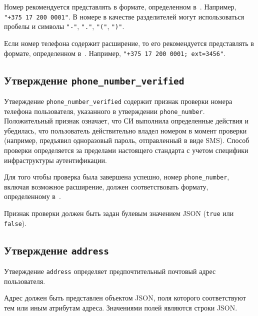 Номер рекомендуется представлять в формате, определенном в~\cite{E-164}. 
Например, \lstinline{"+375 17 200 0001"}. 
%
В номере в качестве разделителей могут использоваться пробелы и символы
\lstinline{"-"}, \lstinline{"."}, \lstinline{"("}, \lstinline{")"}.

Если номер телефона содержит расширение, то его рекомендуется
представлять в формате, определенном в~\cite{RFC3966}.
%
Например, \lstinline{"+375 17 200 0001; ext=3456"}.
%

\subsection{Утверждение \lstinline{phone_number_verified}}
\label{CLAIMS.PhoneNumberVerified}

Утверждение \lstinline{phone_number_verified} содержит признак проверки номера
телефона пользователя, указанного в утверждении \lstinline{phone_number}. 
%
Положительный признак означает, что СИ выполнила определенные действия и
убедилась, что пользователь действительно владел номером в момент проверки
(например, предъявил одноразовый пароль, отправленный в виде SMS).
%
Способ проверки определяется за пределами настоящего стандарта с учетом 
специфики инфраструктуры аутентификации.  

Для того чтобы проверка была завершена успешно, номер \lstinline{phone_number}, 
включая возможное расширение, должен соответствовать формату, определенному 
в~\cite{E-164,RFC3966}.  

Признак проверки должен быть задан булевым значением JSON
(\lstinline{true} или \lstinline{false}). 

\subsection{Утверждение \lstinline{address}}\label{CLAIMS.Address}

Утверждение \lstinline{address} определяет предпочтительный почтовый адрес пользователя. 

Адрес должен быть представлен объектом JSON, поля которого соответствуют тем 
или иным атрибутам адреса. Значениями полей являются строки JSON.

